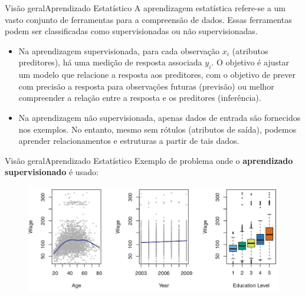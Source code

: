 \documentclass[t]{beamer}
\begin{document}

\begin{ftst}{Visão geral}{{Aprendizado Estatístico}}
\justifying
A aprendizagem estatística refere-se a um vasto conjunto de ferramentas para a compreensão de dados.
\vone
Essas ferramentas podem ser classificadas como supervisionadas ou não supervisionadas. 
\vone
\begin{itemize}
    \item Na aprendizagem supervisionada, para cada observação $x_i$ (atributos preditores), há uma medição de resposta associada $y_i$. O objetivo é ajustar um modelo que relacione a resposta aos preditores, com o objetivo de prever com precisão a resposta para observações futuras (previsão) ou melhor compreender a relação entre a resposta e os preditores (inferência). 
    \item Na aprendizagem não supervisionada, apenas dados de entrada são fornecidos nos exemplos. No entanto, mesmo sem rótulos (atributos de saída), podemos aprender relacionamentos e estruturas a partir de tais dados.
\end{itemize}
\end{ftst}


\begin{ftst}{Visão geral}{{Aprendizado Estatístico}}
\justifying
Exemplo de problema onde o \textbf{aprendizado supervisionado} é usado:
\vone

\begin{figure}
    \centering
    \includegraphics[scale=0.9]{Figuras/slide03_02.jpg}
\end{figure}
\end{ftst}

\end{document}

